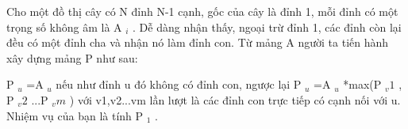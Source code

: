 Cho một đồ thị cây có N đỉnh N-1 cạnh, gốc của cây là đỉnh 1, mỗi đỉnh có một trọng số không âm là A   $_    i   $   . Dễ dàng nhận thấy, ngoại trừ đỉnh 1, các đỉnh còn lại đều có một đỉnh cha và nhận nó làm đỉnh con. Từ mảng A người ta tiến hành xây dựng mảng P như sau:  

   P   $_    u   $   =A   $_    u   $   nếu như đỉnh u đó không có đỉnh con, ngược lại P   $_    u   $   =A   $_    u   $   *max(P   $_    v1   $   , P   $_    v2   $   ...P   $_    vm   $   ) với v1,v2...vm lần lượt là các đỉnh con trực tiếp có cạnh nối với u. Nhiệm vụ của bạn là tính P   $_    1   $   .  

\
